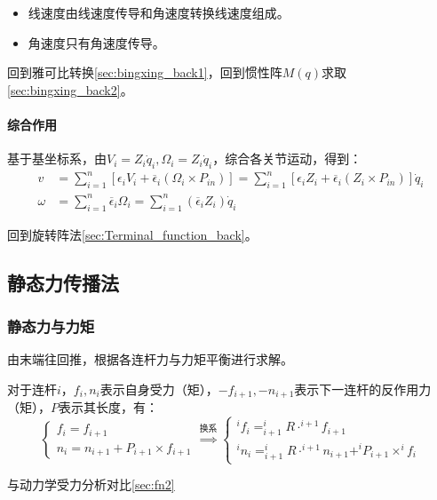 \documentclass[
12pt, %
a4paper, 
oneside, %
headinclude,footinclude, %
]{scrartcl}
\begin{document}
\begin{itemize}
\item 线速度由线速度传导和角速度转换线速度组成。
\item 角速度只有角速度传导。
\end{itemize} 

回到雅可比转换\ref{sec:bingxing_back1}，回到惯性阵$ M(q) $求取\ref{sec:bingxing_back2}。
\paragraph{综合作用}\label{sec:Terminal_function}
基于基坐标系，由$ V_i = Z_i \dot{q}_i, \Omega_i = Z_i \dot{q}_i $，综合各关节运动，得到：
\begin{align*}
v &= \sum_{i = 1}^n [\epsilon_i V_i + \overline{\epsilon}_i (\Omega_i \times P_{in})] = \sum_{i = 1}^n [\epsilon_i Z_i + \overline{\epsilon}_i (Z_i \times P_{in})] \dot{q}_i \\
\omega &= \sum_{i = 1}^n \overline{\epsilon}_i \Omega_i = \sum_{i = 1}^n (\overline{\epsilon}_i Z_i) \dot{q}_i
\end{align*}

回到旋转阵法\ref{sec:Terminal_function_back}。
\subsection{静态力传播法}
\subsubsection{静态力与力矩}\label{sec:fn1}
由末端往回推，根据各连杆力与力矩平衡进行求解。

对于连杆$ i $，$ f_i, n_i $表示自身受力（矩），$ -f_{i + 1}, -n_{i + 1} $表示下一连杆的反作用力（矩），$ P $表示其长度，有：
$$
\begin{cases}
f_i = f_{i + 1} \\
n_i = n_{i + 1} + P_{i + 1} \times f_{i + 1}
\end{cases}
\overset{\text{换系}}{\Longrightarrow}
\begin{cases}
^i f_i = ^i_{i + 1}R \cdot ^{i + 1} f_{i + 1} \\
^i n_i = ^i_{i + 1}R \cdot ^{i + 1} n_{i + 1} + ^i P_{i + 1} \times ^i f_i
\end{cases}
$$

与动力学受力分析对比\ref{sec:fn2}
\end{document}
